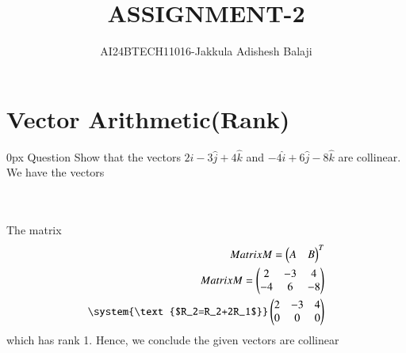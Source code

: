 \documentclass[journal]{IEEEtran}
\begin{document}

\renewcommand{\thefigure}{\theenumi}
\renewcommand{\thetable}{\theenumi}
\setlength{\intextsep}{10pt} %
\renewcommand{\thetable}{\theenumi}
\title{ASSIGNMENT-2}
\author{AI24BTECH11016-Jakkula Adishesh Balaji}
\maketitle
\bigskip
\section*{\textbf{Vector Arithmetic(Rank)}}
         \parindent 0px
         Question Show that the vectors $2\hat{i}-3\hat{j}+4\hat{k}$ and $-4\hat{i}+6\hat{j}-8\hat{k}$ are collinear.\\
         \solution We have the vectors \\ \\
         \begin{table}[h!]
         \centering
         
         \label{tab1.6.2.2}
         \end{table}
\\  
         The matrix 
         \centering
         \begin{align*}
         Matrix M={\myvec{A&B}}^{T} \\
         Matrix M=\myvec{2&-3&4\\-4&6&-8} \\
         \system{\text{$R_2=R_2+2R_1$}}
         \myvec{2&-3&4\\0&0&0}\\
         \end{align*}
         which has rank 1. Hence, we conclude the given vectors are collinear
\end{document}
